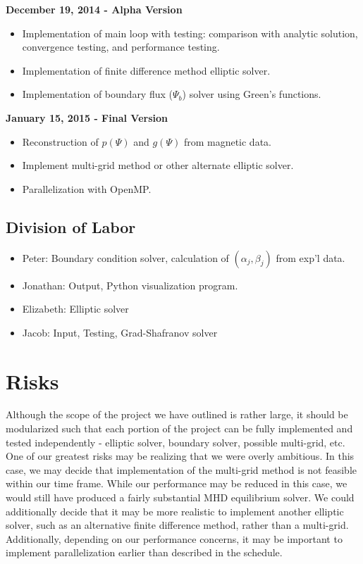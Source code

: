\documentclass[paper=a4, fontsize=11pt]{scrartcl} %
\begin{document}
\textbf{December 19, 2014 - Alpha Version}
\begin{itemize}
\item Implementation of main loop with testing: comparison with analytic solution, convergence testing, and performance testing. 
\item Implementation of finite difference method elliptic solver.
\item Implementation of boundary flux ($\Psi_b$) solver using Green's functions. 
\end{itemize}

\textbf{January 15, 2015 - Final Version}
\begin{itemize}
\item Reconstruction of $p(\Psi)$ and $g(\Psi)$ from magnetic data. 
\item Implement multi-grid method or other alternate elliptic solver. 
\item Parallelization with OpenMP.
\end{itemize}

\subsection{Division of Labor}
\begin{itemize}
\item Peter: Boundary condition solver, calculation of $(\alpha_j,\beta_j)$ from exp'l data.
\item Jonathan: Output, Python visualization program.
\item Elizabeth: Elliptic solver
\item Jacob: Input, Testing, Grad-Shafranov solver
\end{itemize}


\section{Risks}

Although the scope of the project we have outlined is rather large, it should be modularized such that each portion of the project can be fully implemented and tested independently - elliptic solver, boundary solver, possible multi-grid, etc. One of our greatest risks may be realizing that we were overly ambitious. In this case, we may decide that implementation of the multi-grid method is not feasible within our time frame. While our performance may be reduced in this case, we would still have produced a fairly substantial MHD equilibrium solver. We could additionally decide that it may be more realistic to implement another elliptic solver, such as an alternative finite difference method, rather than a multi-grid. Additionally, depending on our performance concerns, it may be important to implement parallelization earlier than described in the schedule. 
\end{document}
